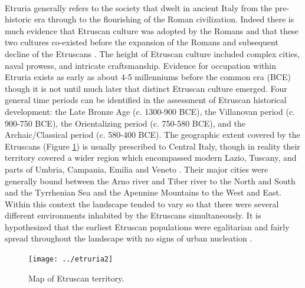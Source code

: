 \documentclass[12pt,a4paper]{thesis}
\begin{document}
\paragraph{}
Etruria generally refers to the society that dwelt in ancient Italy from the pre-historic era through to the flourishing of the Roman civilization. Indeed there is much evidence that Etruscan culture was adopted by the Romans and that  these two cultures co-existed before the expansion of the Romans and subsequent decline of the Etruscans \cite[30-32, 56-60]{Scu80}. The height of Etruscan culture included complex cities, naval prowess, and intricate craftsmanship. Evidence for occupation within Etruria exists as early as about 4-5 millenniums before the common era (BCE) though it is not until much later that  distinct Etruscan culture emerged. Four general time periods can be identified in the assessment of Etruscan historical development: the Late Bronze Age (c. 1300-900 BCE), the Villanovan period (c. 900-750 BCE), the Orientalizing period (c. 750-580 BCE), and the Archaic/Classical period (c. 580-400 BCE). The geographic extent covered by the Etruscans (Figure \ref{fig:etruria}) is usually prescribed to Central Italy, though in reality their territory covered a wider region which encompassed modern Lazio, Tuscany, and parts of Umbria, Campania, Emilia and Veneto \cite[21, 38]{SpiSto92}. Their major cities were generally bound between the Arno river and Tiber river to the North and South and the Tyrrhenian Sea and the Apennine Mountains to the West and East. Within this context the landscape tended to vary so that there were several different environments inhabited by the Etruscans simultaneously. It is hypothesized that the earliest Etruscan populations were egalitarian and fairly spread throughout the landscape with no signs of urban nucleation \cite[44-46]{BarRas98}. 

\begin{figure}
\centering
\texttt{[image: ../etruria2]}
\caption[Map of Etruscan territory]{Map of Etruscan territory\footnotemark.}
\label{fig:etruria}
\end{figure}

\end{document}
